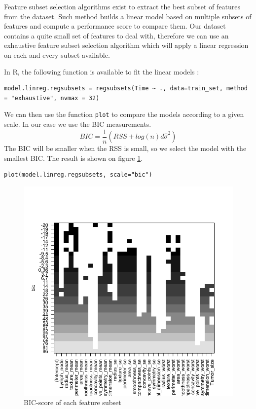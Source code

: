 \documentclass[]{report}
\begin{document}
Feature subset selection algorithms exist to extract the best subset of features from the dataset. Such method builds a linear model based on multiple subsets of features and compute a performance score to compare them. Our dataset contains a quite small set of features to deal with, therefore we can use an exhaustive feature subset selection algorithm which will apply a linear regression on each and every subset available.

In R, the following function is available to fit the linear models :
\begin{lstlisting}
model.linreg.regsubsets = regsubsets(Time ~ ., data=train_set, method = "exhaustive", nvmax = 32)
\end{lstlisting}

We can then use the function \texttt{plot} to compare the models according to a given scale. In our case we use the BIC measurements. $$BIC = \frac{1}{n} (RSS + log(n)d\hat{\sigma}^{2}) $$
The BIC will be smaller when the RSS is small, so we select the model with the smallest BIC. The result is shown on figure \ref{fig:subset_bic}.

\begin{lstlisting}
plot(model.linreg.regsubsets, scale="bic")	
\end{lstlisting}

\begin{figure}[!h]
	\centering
	\includegraphics[width=0.8\linewidth]{Figures/subset_bic.png}
	\caption{BIC-score of each feature subset}
	\label{fig:subset_bic}
\end{figure}
\end{document}
